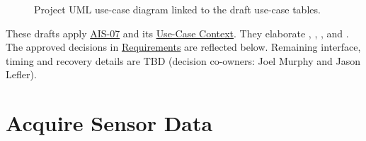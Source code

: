 \begin{figure}[htbp]
\centering

\caption{Project UML use-case diagram linked to the draft use-case tables.}
\label{Figure:UseCaseDiagram}
\end{figure}

These drafts apply \hyperref[Skill:AIS-07]{AIS-07} and its
\hyperref[Section:AIUseCaseContext]{Use-Case Context}. They elaborate
, , , and
. The approved decisions in \hyperref[Section:ProjectAcquisitionConditions]{Requirements}
are reflected below. Remaining interface, timing and recovery details are TBD
(decision co-owners: Joel Murphy and Jason Lefler).

\section{Acquire Sensor Data}
\label{Section:ProjectAcquireUseCase}
